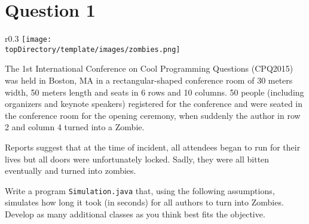%
%
%
%

\section*{Question 1}

\begin{wrapfigure}{r}{0.3\textwidth}
\centering
\texttt{[image: \\topDirectory/template/images/zombies.png]}
\end{wrapfigure}

The 1st International Conference on Cool Programming Questions (CPQ2015) was held in Boston, MA in a rectangular-shaped conference room of 30 meters width, 50 meters length and seats in 6 rows and 10 columns. 50 people (including organizers and keynote speakers) registered for the conference and were seated in the conference room for the opening ceremony, when suddenly the author in row 2 and column 4 turned into a Zombie.

Reports suggest that at the time of incident, all attendees began to run for their lives but all doors were unfortunately locked. Sadly, they were all bitten eventually and turned into zombies.

Write a program \texttt{Simulation.java} that, using the following assumptions, simulates how long it took (in seconds) for all authors to turn into Zombies. Develop as many additional classes as you think best fits the objective.

